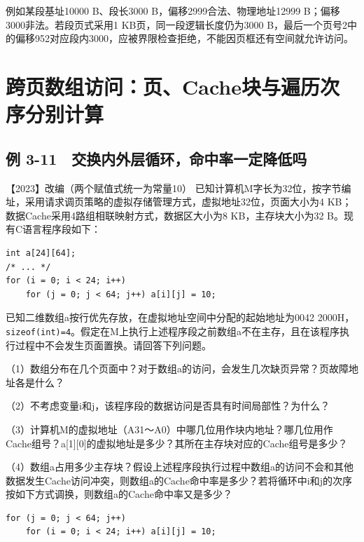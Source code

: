例如某段基址10000 B、段长3000 B，偏移2999合法、物理地址12999 B；偏移3000非法。若段页式采用1 KB页，同一段逻辑长度仍为3000 B，最后一个页号2中的偏移952对应段内3000，应被界限检查拒绝，不能因页框还有空间就允许访问。

\section{跨页数组访问：页、Cache块与遍历次序分别计算}\label{co-memory-synthesis}

\subsection{例 3-11　交换内外层循环，命中率一定降低吗}\label{co-ex3-11}

\noindent{}【2023】改编（两个赋值式统一为常量10） 已知计算机M字长为32位，按字节编址，采用请求调页策略的虚拟存储管理方式，虚拟地址32位，页面大小为4 KB；数据Cache采用4路组相联映射方式，数据区大小为8 KB，主存块大小为32 B。现有C语言程序段如下：

\par\medskip\noindent
\begin{minipage}{\linewidth}
\begin{verbatim}
int a[24][64];
/* ... */
for (i = 0; i < 24; i++)
    for (j = 0; j < 64; j++) a[i][j] = 10;
\end{verbatim}
\end{minipage}\par\medskip

已知二维数组a按行优先存放，在虚拟地址空间中分配的起始地址为0042 2000H，\allowbreak{}\texttt{sizeof(int)=4}。假定在M上执行上述程序段之前数组a不在主存，且在该程序执行过程中不会发生页面置换。请回答下列问题。

（1）数组分布在几个页面中？对于数组a的访问，会发生几次缺页异常？页故障地址各是什么？

（2）不考虑变量i和j，该程序段的数据访问是否具有时间局部性？为什么？

（3）计算机M的虚拟地址（A31～A0）中哪几位用作块内地址？哪几位用作Cache组号？a{[}1{]}{[}0{]}的虚拟地址是多少？其所在主存块对应的Cache组号是多少？

（4）数组a占用多少主存块？假设上述程序段执行过程中数组a的访问不会和其他数据发生Cache访问冲突，则数组a的Cache命中率是多少？若将循环中i和j的次序按如下方式调换，则数组a的Cache命中率又是多少？

\par\medskip\noindent
\begin{minipage}{\linewidth}
\begin{verbatim}
for (j = 0; j < 64; j++)
    for (i = 0; i < 24; i++) a[i][j] = 10;
\end{verbatim}
\end{minipage}\par\medskip

